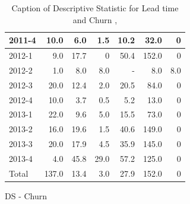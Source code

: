 \documentclass[UKenglish]{ifimaster}  %
\begin{document}
\begin{appendices}
\begin{table}[!htbp]
\begin{adjustwidth}{-1.5cm}{}
\begin{subfigure}[b]{0.7\textwidth}
{\begin{tabular}{ | l | r | r | r | r | r | r | }
2011-4 & 10.0 & 6.0 & 1.5 & 10.2 & 32.0 & 0\\ \hline
2012-1 & 9.0 & 17.7 & 0 & 50.4 & 152.0 & 0\\ \hline
2012-2 & 1.0 & 8.0 & 8.0 & - & 8.0 & 8.0\\ \hline
2012-3 & 20.0 & 12.4 & 2.0 & 20.5 & 84.0 & 0\\ \hline
2012-4 & 10.0 & 3.7 & 0.5 & 5.2 & 13.0 & 0\\ \hline
2013-1 & 22.0 & 9.6 & 5.0 & 15.5 & 73.0 & 0\\ \hline
2013-2 & 16.0 & 19.6 & 1.5 & 40.6 & 149.0 & 0\\ \hline
2013-3 & 20.0 & 17.9 & 4.5 & 35.9 & 145.0 & 0\\ \hline
2013-4 & 4.0 & 45.8 & 29.0 & 57.2 & 125.0 & 0\\ \hline
Total & 137.0 & 13.4 & 3.0 & 27.9 & 152.0 & 0\\ \hline

\end{tabular}
}
\caption{DS - Churn}
 \label{DS:Churn:8}
\end{subfigure}
\end{adjustwidth}
\caption[Optional caption for list of figures]{Caption of Descriptive Statistic for Lead time and Churn  , }
\label{DS:8:3}
\end{table}


\end{appendices}
\end{document}
